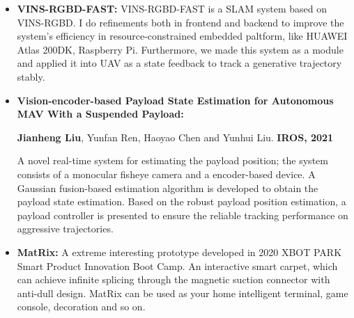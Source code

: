\documentclass[11pt,a4paper,sans]{moderncv}        %
\begin{document}
{\begin{itemize}
\item \textbf{VINS-RGBD-FAST:} VINS-RGBD-FAST is a SLAM system based on VINS-RGBD. I do refinements both in frontend and backend to improve the system's efficiency in resource-constrained embedded paltform, like HUAWEI Atlas 200DK, Raspberry Pi. Furthermore, we made this system as a module and applied it into UAV as a state feedback to track a generative trajectory stably. 

\vspace{6pt}

\item \textbf{Vision-encoder-based Payload State Estimation for Autonomous MAV With a Suspended Payload:} 

\textbf{Jianheng Liu}, Yunfan Ren, Haoyao Chen and Yunhui Liu. \textbf{IROS, 2021}

A novel real-time system for estimating the payload position; the system consists of a monocular fisheye camera and a encoder-based device. A Gaussian fusion-based estimation algorithm is developed to obtain the payload state estimation. Based on the robust payload position estimation, a payload controller is presented to ensure the reliable tracking performance on aggressive trajectories.

\vspace{6pt}

\item \textbf{MatRix:} A extreme interesting prototype developed in 2020 XBOT PARK Smart Product Innovation Boot Camp. An interactive smart carpet, which can achieve infinite splicing through the magnetic suction connector with anti-dull design. MatRix can be used as your home intelligent terminal, game console, decoration and so on.



\end{itemize}}
\end{document}
